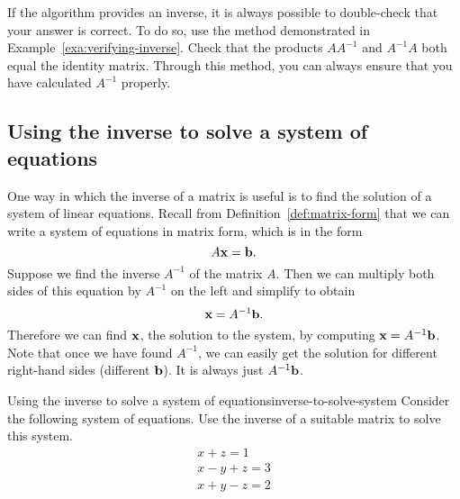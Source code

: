 If the algorithm provides an inverse, it is always possible to
double-check that your answer is correct.  To do so, use the method
demonstrated in Example~\ref{exa:verifying-inverse}. Check that the
products $AA^{-1}$ and $A^{-1}A$ both equal the identity
matrix. Through this method, you can always ensure that you have
calculated $A^{-1}$ properly.

\subsection{Using the inverse to solve a system of equations}

One way in which the inverse of a matrix is useful is to find the
solution of a system of linear equations.  Recall from Definition~\ref{def:matrix-form} that we can write a system of equations in
matrix form, which is in the form
\begin{equation*}
  A\vect{x}=\vect{b}.
\end{equation*}
Suppose we find the inverse $A^{-1}$ of the matrix $A$. Then we can
multiply both sides of this equation by $A^{-1}$ on the left and
simplify to obtain
\begin{equation*}
  \vect{x} = A^{-1}\vect{b}.
\end{equation*}
Therefore we can find $\vect{x}$, the solution to the system, by
computing $\vect{x} = A^{-1}\vect{b}$. Note that once we have found
$A^{-1}$, we can easily get the solution for different right-hand
sides (different $\vect{b}$). It is always just $A^{-1}\vect{b}$.

\begin{example}{Using the inverse to solve a system of equations}{inverse-to-solve-system}
  Consider the following system of equations. Use the inverse of a
  suitable matrix to solve this system.
  \begin{equation*}
    \begin{array}{c}
      x+z=1 \\
      x-y+z=3 \\
      x+y-z=2
    \end{array}
  \end{equation*}
\end{example}

